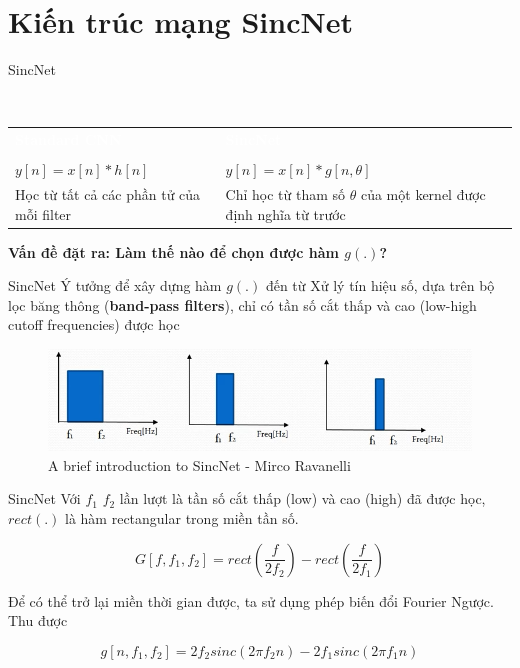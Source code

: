 \documentclass[11pt]{beamer}
\begin{document}
\section{Kiến trúc mạng SincNet}
\begin{frame}{SincNet}
	\begin{block}{~\vspace{0.7cm}}
		\begin{center}
			\vspace{-0.8cm}
			\begin{tabular}{p{0.45\textwidth}|p{}}
				\textcolor{white}{\bf Standard CNN} & \textcolor{white}{\bf SincNet} \\\\
				 $y[n] = x[n] * h[n]$ & $y[n] = x[n] * g[n, \theta]$\\
				 Học từ tất cả các phần tử của mỗi filter & Chỉ học từ tham số $\theta$ của một kernel được định nghĩa từ trước\\
			\end{tabular}
		\end{center}
	\end{block}
	\textbf{Vấn đề đặt ra: Làm thế nào để chọn được hàm $g(.)$?}
\end{frame}
\begin{frame}{SincNet}
	Ý tưởng để xây dựng hàm $g(.)$ đến từ Xử lý tín hiệu số, dựa trên bộ lọc băng thông (\textbf{band-pass filters}), chỉ có tần số cắt thấp và cao (low-high cutoff frequencies) được học
	\begin{figure}[H]
		\includegraphics[width=0.9\linewidth]{images/band_passfilters.png}
		\caption{A brief introduction to SincNet - Mirco Ravanelli}
		\label{fig:writing-thesis}
	\end{figure}
\end{frame}
\begin{frame}{SincNet}
	Với $f_1$ $f_2$ lần lượt là tần số cắt thấp (low) và cao (high) đã được học, $rect(.)$ là hàm rectangular trong miền tần số.
	
	$$G[f, f_1, f_2] = rect\left(\frac{f}{2f_2}\right) -  rect\left(\frac{f}{2f_1}\right)$$
	
	Để có thể trở lại miền thời gian được, ta sử dụng phép biến đổi Fourier Ngược. Thu được
	
	$$g[n, f_1, f_2] = 2f_2sinc(2\pi f_2 n) - 2f_1sinc(2\pi f_1 n)$$ 
\end{frame}
\end{document}
